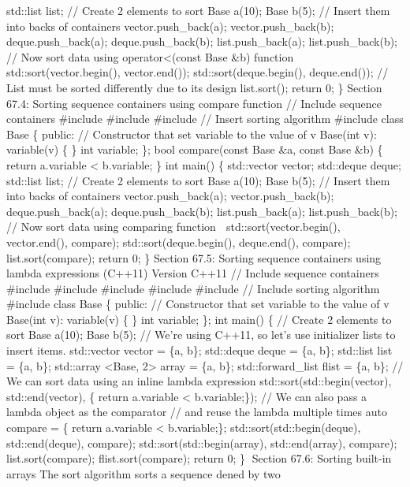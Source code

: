std::list list; // Create 2 elements to sort Base a(10); Base b(5); //
Insert them into backs of containers vector.push\_back(a);
vector.push\_back(b);  deque.push\_back(a); deque.push\_back(b);
list.push\_back(a); list.push\_back(b); // Now sort data using
operator\textless(const Base \&b) function std::sort(vector.begin(),
vector.end()); std::sort(deque.begin(), deque.end()); // List must be
sorted differently due to its design list.sort(); return 0; \} Section
67.4: Sorting sequence containers using compare function // Include
sequence containers \#include \#include \#include // Insert sorting
algorithm \#include class Base \{ public: // Constructor that set
variable to the value of v Base(int v): variable(v) \{ \} int variable;
\}; bool compare(const Base \&a, const Base \&b) \{ return a.variable
\textless{} b.variable; \} int main() \{ std::vector vector; std::deque
deque; std::list list; // Create 2 elements to sort Base a(10); Base
b(5); // Insert them into backs of containers vector.push\_back(a);
vector.push\_back(b); deque.push\_back(a); deque.push\_back(b);
list.push\_back(a); list.push\_back(b); // Now sort data using comparing
function  std::sort(vector.begin(), vector.end(), compare);
std::sort(deque.begin(), deque.end(), compare); list.sort(compare);
return 0; \} Section 67.5: Sorting sequence containers using lambda
expressions (C++11) Version C++11 // Include sequence containers
\#include \#include \#include \#include \#include // Include sorting
algorithm \#include class Base \{ public: // Constructor that set
variable to the value of v Base(int v): variable(v) \{ \} int variable;
\}; int main() \{ // Create 2 elements to sort Base a(10); Base b(5); //
We're using C++11, so let's use initializer lists to insert items.
std::vector vector = \{a, b\}; std::deque deque = \{a, b\}; std::list
list = \{a, b\}; std::array \textless Base, 2\textgreater{} array = \{a,
b\}; std::forward\_list flist = \{a, b\}; // We can sort data using an
inline lambda expression std::sort(std::begin(vector), std::end(vector),
\href{const\%20Base\%20\&a,\%20const\%20Base\%20\&b}{} \{ return
a.variable \textless{} b.variable;\}); // We can also pass a lambda
object as the comparator // and reuse the lambda multiple times auto
compare = \href{const\%20Base\%20\&a,\%20const\%20Base\%20\&b}{} \{
return a.variable \textless{} b.variable;\};
std::sort(std::begin(deque), std::end(deque), compare);
std::sort(std::begin(array), std::end(array), compare);
list.sort(compare); flist.sort(compare); return 0; \} Section 67.6:
Sorting built-in arrays The sort algorithm sorts a sequence dened by two
